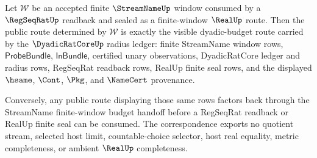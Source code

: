 \begin{theorem}
\label{thm:streamname-regseqrat-realup-dyadic-budget-correspondence}
Let $\mathcal W$ be an accepted finite $\StreamNameUp$ window consumed by a
$\RegSeqRatUp$ readback and sealed as a finite-window $\RealUp$ route. Then the
public route determined by $\mathcal W$ is exactly the visible dyadic-budget
route carried by the $\DyadicRatCoreUp$ radius ledger: finite StreamName window
rows, $\mathsf{ProbeBundle}$, $\mathsf{InBundle}$, certified unary observations,
DyadicRatCore ledger and radius rows, RegSeqRat readback rows, RealUp finite seal
rows, and the displayed $\hsame$, $\Cont$, $\Pkg$, and $\NameCert$ provenance.

Conversely, any public route displaying those same rows factors back through the
StreamName finite-window budget handoff before a RegSeqRat readback or RealUp
finite seal can be consumed. The correspondence exports no quotient stream,
selected host limit, countable-choice selector, host real equality, metric
completeness, or ambient $\RealUp$ completeness.
\end{theorem}
